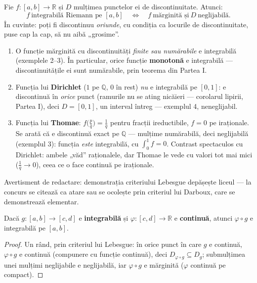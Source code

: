 \begin{teorema}
Fie $f:[a,b]\to\mathbb{R}$ și $D$ mulțimea punctelor ei de discontinuitate. Atunci:
\[
f\ \text{integrabilă Riemann pe }[a,b]
\quad\Longleftrightarrow\quad
f\ \text{mărginită și}\ D\ \text{neglijabilă}.
\]
În cuvinte: poți fi discontinuu \emph{oriunde}, cu condiția ca locurile de discontinuitate, puse cap la cap, să nu aibă „grosime''.
\end{teorema}

\begin{obs}
\begin{enumerate}[leftmargin=*, itemsep=2pt]
\item O funcție mărginită cu discontinuități \emph{finite sau numărabile} e integrabilă (exemplele 2--3). În particular, orice funcție \textbf{monotonă} e integrabilă --- discontinuitățile ei sunt numărabile, prin teorema din Partea I.
\item Funcția lui \textbf{Dirichlet} ($1$ pe $\mathbb{Q}$, $0$ în rest) \emph{nu} e integrabilă pe $[0,1]$: e discontinuă în \emph{orice} punct (ramurile nu se ating nicăieri --- corolarul lipirii, Partea I), deci $D=[0,1]$, un interval întreg --- exemplul 4, neneglijabil.
\item Funcția lui \textbf{Thomae}: $f\big(\frac pq\big)=\frac1q$ pentru fracții ireductibile, $f=0$ pe iraționale. Se arată că e discontinuă exact pe $\mathbb{Q}$ --- mulțime numărabilă, deci neglijabilă (exemplul 3): funcția \emph{este} integrabilă, cu $\int_0^1 f=0$. Contrast spectaculos cu Dirichlet: ambele „văd'' raționalele, dar Thomae le vede cu valori tot mai mici ($\frac1q\to0$), ceea ce o face continuă pe iraționale.
\end{enumerate}
Avertisment de redactare: demonstrația criteriului Lebesgue depășește liceul --- la concurs se citează ca atare sau se ocolește prin criteriul lui Darboux, care se demonstrează elementar.
\end{obs}

\begin{teorema}
Dacă $g:[a,b]\to[c,d]$ e \textbf{integrabilă} și $\varphi:[c,d]\to\mathbb{R}$ e \textbf{continuă}, atunci $\varphi\circ g$ e integrabilă pe $[a,b]$.
\end{teorema}
\begin{proof}
Un rând, prin criteriul lui Lebesgue: în orice punct în care $g$ e continuă, $\varphi\circ g$ e continuă (compunere cu funcție continuă), deci $D_{\varphi\circ g}\subseteq D_g$; submulțimea unei mulțimi neglijabile e neglijabilă, iar $\varphi\circ g$ e mărginită ($\varphi$ continuă pe compact). 
\end{proof}

